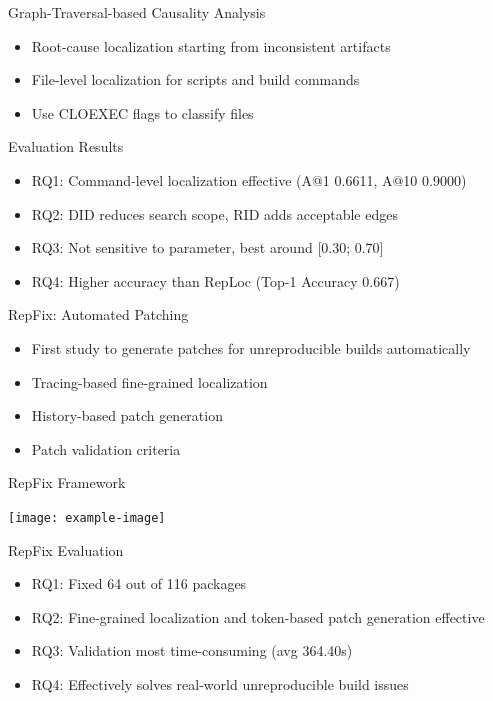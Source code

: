 \documentclass{beamer}
\begin{document}
\begin{frame}{Graph-Traversal-based Causality Analysis}
\begin{itemize}
\item Root-cause localization starting from inconsistent artifacts
\item File-level localization for scripts and build commands
\item Use CLOEXEC flags to classify files
\end{itemize}
\end{frame}

\begin{frame}{Evaluation Results}
\begin{itemize}
\item RQ1: Command-level localization effective (A@1 0.6611, A@10 0.9000)
\item RQ2: DID reduces search scope, RID adds acceptable edges
\item RQ3: Not sensitive to parameter, best around [0.30; 0.70]
\item RQ4: Higher accuracy than RepLoc (Top-1 Accuracy 0.667)
\end{itemize}
\end{frame}

\begin{frame}{RepFix: Automated Patching}
\begin{itemize}
\item First study to generate patches for unreproducible builds automatically
\item Tracing-based fine-grained localization
\item History-based patch generation
\item Patch validation criteria
\end{itemize}
\end{frame}

\begin{frame}{RepFix Framework}
\begin{center}
\texttt{[image: example-image]}
\end{center}
\end{frame}

\begin{frame}{RepFix Evaluation}
\begin{itemize}
\item RQ1: Fixed 64 out of 116 packages
\item RQ2: Fine-grained localization and token-based patch generation effective
\item RQ3: Validation most time-consuming (avg 364.40s)
\item RQ4: Effectively solves real-world unreproducible build issues
\end{itemize}
\end{frame}
\end{document}
